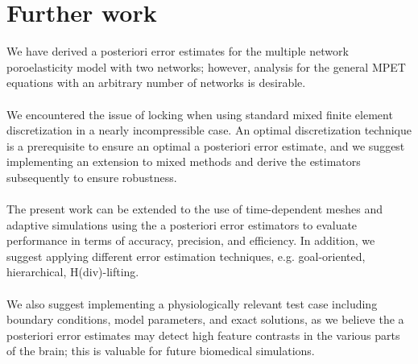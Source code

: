 \section{Further work} \label{section:further_work}
We have derived a posteriori error estimates for the multiple network poroelasticity model with two networks; however, analysis for the general MPET equations with an arbitrary number of networks is desirable.
\\
\\
We encountered the issue of locking when using standard mixed finite element discretization in a nearly incompressible case. An optimal discretization technique is a prerequisite to ensure an optimal a posteriori error estimate, and we suggest implementing an extension to mixed methods and derive the estimators subsequently to ensure robustness. 
\\
\\
The present work can be extended to the use of time-dependent meshes and adaptive simulations using the a posteriori error estimators to evaluate performance in terms of accuracy, precision, and efficiency. In addition, we suggest applying different error estimation techniques, e.g. goal-oriented, hierarchical, H(div)-lifting. 
\\
\\
We also suggest implementing a physiologically relevant test case including boundary conditions, model parameters, and exact solutions, as we believe the a posteriori error estimates may detect high feature contrasts in the various parts of the brain; this is valuable for future biomedical simulations. 